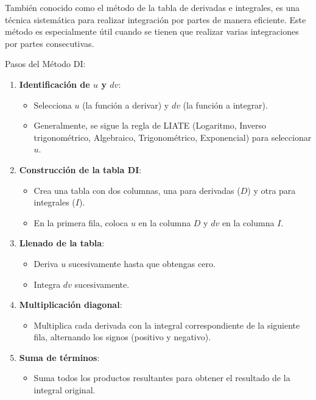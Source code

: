 \begin{definition}[Método DI]
    También conocido como el método de la tabla de derivadas e integrales, es una técnica sistemática para realizar integración por partes de manera eficiente. Este método es especialmente útil cuando se tienen que realizar varias integraciones por partes consecutivas.
\end{definition}
Pasos del Método DI:
\begin{enumerate}
    \item \textbf{Identificación de \( u \) y \( dv \)}:
    \begin{itemize}
        \item Selecciona \( u \) (la función a derivar) y \( dv \) (la función a integrar).
        \item Generalmente, se sigue la regla de LIATE (Logaritmo, Inverso trigonométrico, Algebraico, Trigonométrico, Exponencial) para seleccionar \( u \).
    \end{itemize}
    \item \textbf{Construcción de la tabla DI}:
    \begin{itemize}
        \item Crea una tabla con dos columnas, una para derivadas (\( D \)) y otra para integrales (\( I \)).
        \item En la primera fila, coloca \( u \) en la columna \( D \) y \( dv \) en la columna \( I \).
    \end{itemize}
    \item \textbf{Llenado de la tabla}:
    \begin{itemize}
        \item Deriva \( u \) sucesivamente hasta que obtengas cero.
        \item Integra \( dv \) sucesivamente.
    \end{itemize}
    \item \textbf{Multiplicación diagonal}:
    \begin{itemize}
        \item Multiplica cada derivada con la integral correspondiente de la siguiente fila, alternando los signos (positivo y negativo).
    \end{itemize}
    \item \textbf{Suma de términos}:
    \begin{itemize}
        \item Suma todos los productos resultantes para obtener el resultado de la integral original.
    \end{itemize}
\end{enumerate}

